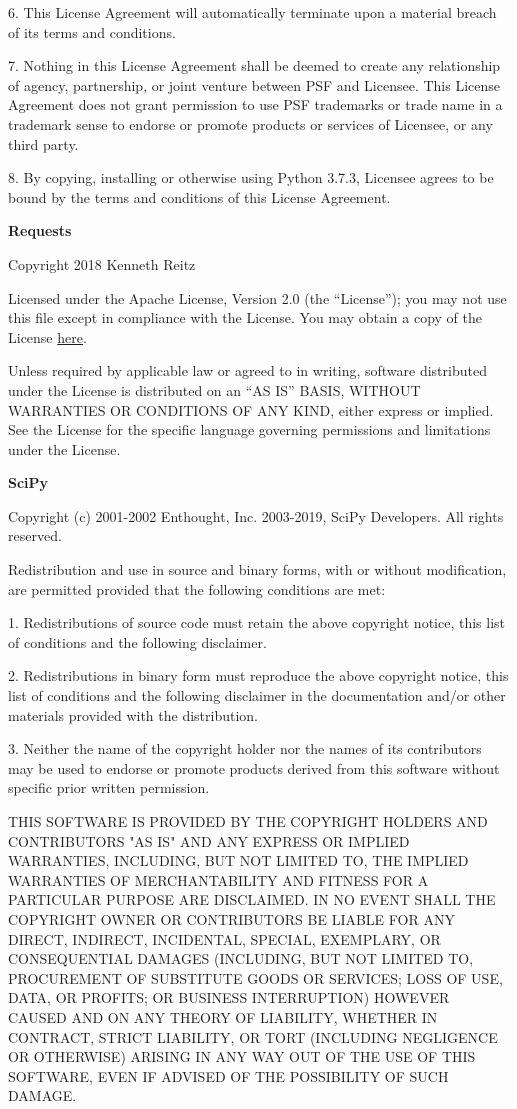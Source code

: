 6. This License Agreement will automatically terminate upon a material breach of
its terms and conditions.

7. Nothing in this License Agreement shall be deemed to create any relationship
of agency, partnership, or joint venture between PSF and Licensee.  This License
Agreement does not grant permission to use PSF trademarks or trade name in a
trademark sense to endorse or promote products or services of Licensee, or any
third party.

8. By copying, installing or otherwise using Python 3.7.3, Licensee agrees
to be bound by the terms and conditions of this License Agreement.

\textbf{Requests}

Copyright 2018 Kenneth Reitz

Licensed under the Apache License, Version 2.0 (the “License”); you may not use this file except in compliance with the License. You may obtain a copy of the License \href{https://www.apache.org/licenses/LICENSE-2.0}{here}.

Unless required by applicable law or agreed to in writing, software distributed under the License is distributed on an “AS IS” BASIS, WITHOUT WARRANTIES OR CONDITIONS OF ANY KIND, either express or implied. See the License for the specific language governing permissions and limitations under the License.

\textbf{SciPy}

Copyright (c) 2001-2002 Enthought, Inc.  2003-2019, SciPy Developers.
All rights reserved.

Redistribution and use in source and binary forms, with or without
modification, are permitted provided that the following conditions
are met:

1. Redistributions of source code must retain the above copyright
notice, this list of conditions and the following disclaimer.

2. Redistributions in binary form must reproduce the above
copyright notice, this list of conditions and the following
disclaimer in the documentation and/or other materials provided
with the distribution.

3. Neither the name of the copyright holder nor the names of its
contributors may be used to endorse or promote products derived
from this software without specific prior written permission.

THIS SOFTWARE IS PROVIDED BY THE COPYRIGHT HOLDERS AND CONTRIBUTORS
"AS IS" AND ANY EXPRESS OR IMPLIED WARRANTIES, INCLUDING, BUT NOT
LIMITED TO, THE IMPLIED WARRANTIES OF MERCHANTABILITY AND FITNESS FOR
A PARTICULAR PURPOSE ARE DISCLAIMED. IN NO EVENT SHALL THE COPYRIGHT
OWNER OR CONTRIBUTORS BE LIABLE FOR ANY DIRECT, INDIRECT, INCIDENTAL,
SPECIAL, EXEMPLARY, OR CONSEQUENTIAL DAMAGES (INCLUDING, BUT NOT
LIMITED TO, PROCUREMENT OF SUBSTITUTE GOODS OR SERVICES; LOSS OF USE,
DATA, OR PROFITS; OR BUSINESS INTERRUPTION) HOWEVER CAUSED AND ON ANY
THEORY OF LIABILITY, WHETHER IN CONTRACT, STRICT LIABILITY, OR TORT
(INCLUDING NEGLIGENCE OR OTHERWISE) ARISING IN ANY WAY OUT OF THE USE
OF THIS SOFTWARE, EVEN IF ADVISED OF THE POSSIBILITY OF SUCH DAMAGE.

